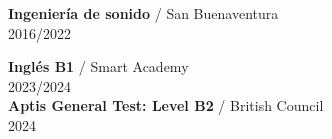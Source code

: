 
\textbf{Ingeniería de sonido} / San Buenaventura \\
\textcolor{black!70}{2016/2022} \par

\textbf{Inglés B1} / Smart Academy \\
\textcolor{black!70}{2023/2024} \\

\textbf{Aptis General Test: Level B2} / British Council \\
\textcolor{black!70}{2024} \\